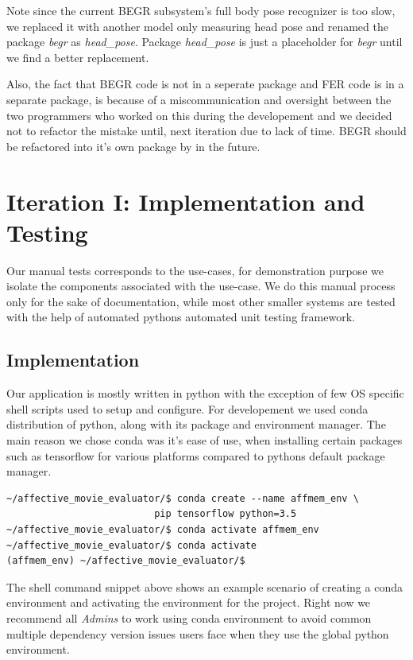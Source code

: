 \documentclass[12pt,a4paper,man]{report}
\begin{document}
Note since the current BEGR subsystem's full body pose recognizer is too slow, we replaced it with another model only measuring head pose and renamed the package \emph{begr} as \emph{head\_pose}. Package \emph{head\_pose} is just a placeholder for \emph{begr} until we find a better replacement. 

Also, the fact that BEGR code is not in a seperate package and FER code is in a separate package, is because of a miscommunication and oversight between the two programmers who worked on this during the developement and we decided not to refactor the mistake until, next iteration due to lack of time. BEGR should be refactored into it's own package by in the future.

\chapter{Iteration I: Implementation and Testing}
\label{sec:org940ab6a}

Our manual tests corresponds to the use-cases, for demonstration purpose we isolate the components associated with the use-case. We do this manual process only for the sake of documentation, while most other smaller systems are tested with the help of automated pythons automated unit testing framework.

\section{Implementation}
\label{sec:orgab81e06}
Our application is mostly written in python with the exception of few OS specific shell scripts used to setup and configure. For developement we used conda distribution of python, along with its package and environment manager. The main reason we chose conda was it's ease of use, when installing certain packages such as tensorflow for various platforms compared to pythons default package manager.

\begin{verbatim}
~/affective_movie_evaluator/$ conda create --name affmem_env \
						  pip tensorflow python=3.5
~/affective_movie_evaluator/$ conda activate affmem_env
~/affective_movie_evaluator/$ conda activate 
(affmem_env) ~/affective_movie_evaluator/$ 
\end{verbatim}

The shell command snippet above shows an example scenario of creating a conda environment and activating the environment for the project. Right now we recommend all \emph{Admins} to work using conda environment to avoid common multiple dependency version issues users face when they use the global python environment.
\end{document}

